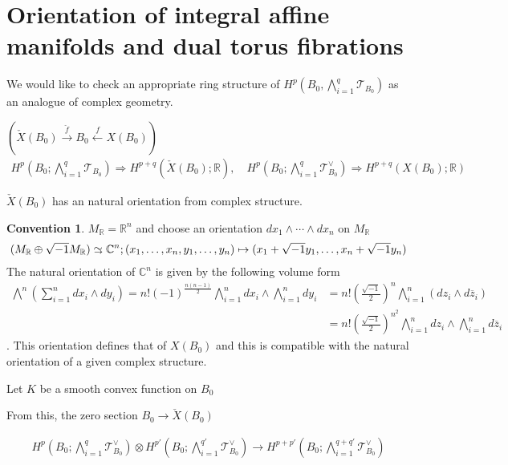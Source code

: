 \documentclass[a4paper,dvipdfmx,reqno,12pt]{amsart}
\theoremstyle{definition}
\newtheorem{Conv}[Thm]{Convention}
\newcommand{\C}{\mathbb{C}}%
\newcommand{\R}{\mathbb{R}}%
\newcommand{\mcal}[1]{\mathcal{#1}}%
\newcommand{\Paren}[1]{\left ( {#1} \right )}%
\newcommand{\xto}[1]{\xrightarrow{#1}}
\newcommand{\TB}{\mcal{T}_{B_0}}
\newcommand{\simto}{ 
\mathrel{\raisebox{0.13em}{${\sim}$}}
\kern -0.75em \mathrel{\raisebox{-0.11em}{${\scriptstyle \to}$}}  
}
\numberwithin{equation}{section}
\begin{document}
\section{Orientation of integral affine manifolds and dual torus fibrations}

We would like to check an appropriate ring structure of
$H^{p}(B_0,\bigwedge_{i=1}^{q}\TB)$ as an analogue of complex geometry.

$(\check{X}(B_0)\xto{\check{f}} B_0 \stackrel{f}{\gets} X(B_0))$
\begin{align}
  H^{p}(B_0;\bigwedge_{i=1}^{q}\TB) \Longrightarrow
  H^{p+q}(\check{X}(B_0);\R),
  \quad
  H^{p}(B_0;\bigwedge_{i=1}^{q}\TB^{\vee}) \Longrightarrow
  H^{p+q}(X(B_0);\R)
\end{align}

$\check{X}(B_0)$ has an natural orientation from complex structure.

\begin{Conv}
  $M_{\R}=\R^{n}$ and choose an orientation
  $dx_1\wedge \cdots\wedge dx_n$ on $M_{\R}$
  \begin{align}
    (M_{\R}\oplus \sqrt{-1}M_{\R})\simto\C^{n};(x_1,\ldots,x_n,y_1,\ldots,y_n)
    \mapsto (x_1+\sqrt{-1}y_1,\ldots,x_n+\sqrt{-1}y_n)
  \end{align}
  The natural orientation of $\C^{n}$ is given by the following volume form
  \begin{align}
    \bigwedge^{n}(\sum_{i=1}^{n} dx_i\wedge dy_i)
    =n!\Paren{-1}^{\frac{n(n-1)}{2}}\bigwedge_{i=1}^{n} dx_i\wedge
    \bigwedge_{i=1}^{n} dy_i
     & =n!\Paren{\frac{\sqrt{-1}}{2}}^{n} \bigwedge_{i=1}^{n}
    (dz_i\wedge d\overline{z}_i)                                  \\
     & =n!\Paren{\frac{\sqrt{-1}}{2}}^{n^{2}} \bigwedge_{i=1}^{n}
    dz_i\wedge \bigwedge_{i=1}^{n}d\overline{z}_i
  \end{align}
  \cite[p.18]{griffithsPrinciplesAlgebraicGeometry1994a}.
  This orientation defines that of $X(B_0)$ and this is compatible with
  the natural orientation of a given complex structure.
\end{Conv}

Let $K$ be a smooth convex function on $B_0$

From this, the zero section $B_0\to \check{X}(B_0)$

\begin{align}
  H^{p}(B_0;\bigwedge_{i=1}^{q}\TB^{\vee})\otimes H^{p'}(B_0;\bigwedge_{i=1}^{q'}\TB^{\vee})
  \to H^{p+p'}(B_0;\bigwedge_{i=1}^{q+q'}\TB^{\vee})
\end{align}
\end{document}
